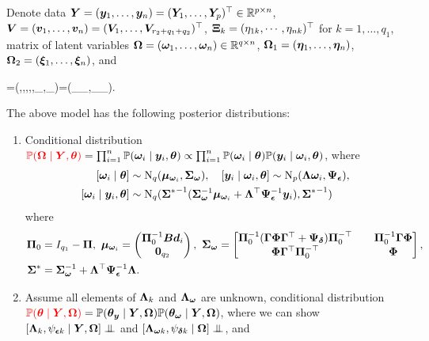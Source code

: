 \documentclass[10pt,a4paper]{book}
\begin{document}
Denote data ${\boldsymbol Y}=({\boldsymbol y}_1,\ldots,{\boldsymbol y}_n)=({\boldsymbol Y}_1,\ldots,{\boldsymbol Y}_p)^\top\in\mathbb R^{p\times n}$, ${\boldsymbol V}=({\boldsymbol v}_1,\ldots,{\boldsymbol v}_n)=({\boldsymbol V}_1,\ldots,{\boldsymbol V}_{r_2+q_1+q_2})^\top$, ${\boldsymbol\Xi}_{k}=(\eta_{1k},\cdots,\eta_{nk})^\top$ for $k=1,\ldots,q_1$, matrix of latent variables ${\boldsymbol\Omega}=({\boldsymbol\omega}_1,\ldots,{\boldsymbol\omega}_n)\in\mathbb R^{q\times n}$, ${\boldsymbol\Omega}_1=({\boldsymbol\eta}_1,\ldots,{\boldsymbol\eta}_n)$, ${\boldsymbol\Omega}_2=({\boldsymbol\xi}_1,\ldots,{\boldsymbol\xi}_n)$, and 
\begin{sequation*}
	\baq=(\baL,\B,\baP,\baG,\baF,\baY_\bae,\baY_\bad)=(\underbrace{\baL,\baY_\bae}_{\baq_\y},\underbrace{\baL_\bao,\baF,\baY_\bad}_{\baq_{\bao}}).
\end{sequation*}   
\begin{thmbox}{}
	\begin{proposition}\label{prop:post_linearSEM}
		The above model has the following posterior distributions:
		\begin{enumerate} 
			\item Conditional distribution $\textcolor{red}{\mathbb P({\boldsymbol\Omega}\mid{\boldsymbol Y},{\boldsymbol\theta})}=\prod_{i=1}^n\mathbb P({\boldsymbol\omega}_i\mid{\boldsymbol y}_i,{\boldsymbol\theta})\propto\prod_{i=1}^{n}\mathbb P({\boldsymbol\omega}_i\mid{\boldsymbol\theta})\mathbb P({\boldsymbol y}_i\mid{\boldsymbol\omega}_i,{\boldsymbol\theta})$, where 
			\begin{equation*}
				\begin{aligned}
					[\bao_i\mid\baq]&\sim\rmN_q(\bam_{\bao_i},\baS_\bao), \quad 
					[\y_i\mid\bao_i,\baq]\sim\rmN_{p}(\baL\bao_i,\baY_\bae),\\
					[\bao_i\mid\y_i,\baq]&\sim\rmN_q({\baS^{*}}^{-1}(\baS_{\bao}^{-1}\bam_{\bao_i}+\baL^\TT\baY_{\bae}^{-1}\y_i),{\baS^{*}}^{-1})
				\end{aligned}
			\end{equation*}
			where 
			\begin{equation*}
				\begin{aligned}
					\baP_0&=I_{q_1}-\baP, \ \bam_{\bao_i}=\begin{pmatrix}\baP_0^{-1}\B \d_i\\\0_{q_2}\end{pmatrix}, \ \baS_\bao=\begin{bmatrix}\baP_0^{-1}(\baG\baF\baG^\TT+\baY_\bad)\baP_0^{-\TT}&&\baP_0^{-1}\baG\baF\\\baF\baG^\TT\baP_0^{-\TT}&&\baF\end{bmatrix},\\
					\baS^{*}&=\baS_{\bao}^{-1}+\baL^\TT \baY_{\bae}^{-1}\baL.
				\end{aligned}
			\end{equation*}
			\item Assume all elements of ${\boldsymbol\Lambda}_k$ and ${\boldsymbol\Lambda}_{\boldsymbol\omega}$ are unknown, conditional distribution $\textcolor{red}{\mathbb P({\boldsymbol\theta}\mid{\boldsymbol Y},{\boldsymbol\Omega})}=\mathbb P({\boldsymbol\theta}_{\boldsymbol y}\mid{\boldsymbol Y},{\boldsymbol\Omega})\mathbb P({\boldsymbol\theta}_{\boldsymbol\omega}\mid{\boldsymbol Y},{\boldsymbol\Omega})$, where we can show $[\baL_k,\psi_{\bae k}\mid \Y,\baO] \indep$ and $[\baL_{\bao k},\psi_{\bad k}\mid \baO]\indep$, and  

\end{enumerate}
\end{proposition}
\end{thmbox}
\end{document}
